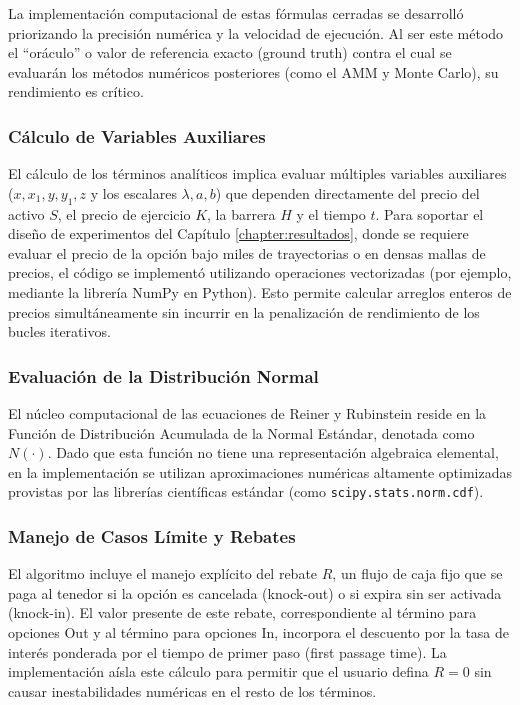 La implementación computacional de estas fórmulas cerradas se desarrolló priorizando la precisión numérica y la velocidad de ejecución. Al ser este método el ``oráculo'' o valor de referencia exacto (ground truth) contra el cual se evaluarán los métodos numéricos posteriores (como el AMM y Monte Carlo), su rendimiento es crítico.

\subsubsection{Cálculo de Variables Auxiliares}

El cálculo de los términos analíticos implica evaluar múltiples variables auxiliares ($x,x_1,y,y_1,z$ y los escalares $\lambda,a,b$) que dependen directamente del precio del activo $S$, el precio de ejercicio $K$, la barrera $H$ y el tiempo $t$. Para soportar el diseño de experimentos del Capítulo \ref{chapter:resultados}, donde se requiere evaluar el precio de la opción bajo miles de trayectorias o en densas mallas de precios, el código se implementó utilizando operaciones vectorizadas (por ejemplo, mediante la librería NumPy en Python). Esto permite calcular arreglos enteros de precios simultáneamente sin incurrir en la penalización de rendimiento de los bucles iterativos.

\subsubsection{Evaluación de la Distribución Normal}

El núcleo computacional de las ecuaciones de Reiner y Rubinstein reside en la Función de Distribución Acumulada de la Normal Estándar, denotada como $N(\cdot)$. Dado que esta función no tiene una representación algebraica elemental, en la implementación se utilizan aproximaciones numéricas altamente optimizadas provistas por las librerías científicas estándar (como \lstinline{scipy.stats.norm.cdf}).

\subsubsection{Manejo de Casos Límite y Rebates}

El algoritmo incluye el manejo explícito del rebate $R$, un flujo de caja fijo que se paga al tenedor si la opción es cancelada (knock-out) o si expira sin ser activada (knock-in). El valor presente de este rebate, correspondiente al término para opciones Out y al término para opciones In, incorpora el descuento por la tasa de interés ponderada por el tiempo de primer paso (first passage time). La implementación aísla este cálculo para permitir que el usuario defina $R=0$ sin causar inestabilidades numéricas en el resto de los términos.


